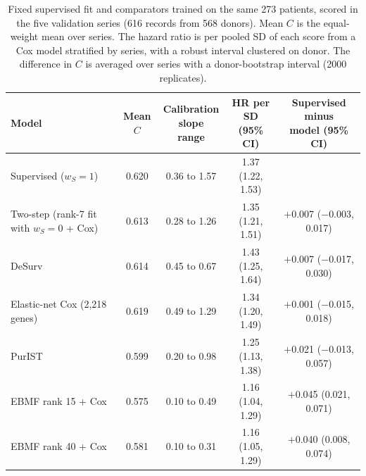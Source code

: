 \begin{table}[!htb]
\centering
\small
\setlength{\tabcolsep}{3pt}
\begin{tabular}{lcccc}
\toprule
Model & Mean $C$ & \shortstack{Calibration\\slope range} & \shortstack{HR per SD\\(95\% CI)} & \shortstack{Supervised minus\\model (95\% CI)} \\
\midrule
Supervised ($w_S = 1$) & 0.620 & 0.36 to 1.57 & 1.37 (1.22, 1.53) &  \\
Two-step (rank-7 fit with $w_S = 0$ + Cox) & 0.613 & 0.28 to 1.26 & 1.35 (1.21, 1.51) & $+$0.007 ($-$0.003, 0.017) \\
DeSurv & 0.614 & 0.45 to 0.67 & 1.43 (1.25, 1.64) & $+$0.007 ($-$0.017, 0.030) \\
Elastic-net Cox (2,218 genes) & 0.619 & 0.49 to 1.29 & 1.34 (1.20, 1.49) & $+$0.001 ($-$0.015, 0.018) \\
PurIST & 0.599 & 0.20 to 0.98 & 1.25 (1.13, 1.38) & $+$0.021 ($-$0.013, 0.057) \\
EBMF rank 15 + Cox & 0.575 & 0.10 to 0.49 & 1.16 (1.04, 1.29) & $+$0.045 (0.021, 0.071) \\
EBMF rank 40 + Cox & 0.581 & 0.10 to 0.31 & 1.16 (1.05, 1.29) & $+$0.040 (0.008, 0.074) \\
\bottomrule
\end{tabular}
\caption{Fixed supervised fit and comparators trained on the same 273 patients, scored in the five validation series (616 records from 568 donors). Mean $C$ is the equal-weight mean over series. The hazard ratio is per pooled SD of each score from a Cox model stratified by series, with a robust interval clustered on donor. The difference in $C$ is averaged over series with a donor-bootstrap interval (2000 replicates).}
\label{tab:comparators}
\end{table}
